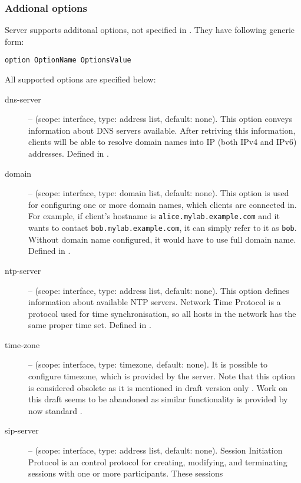 \subsubsection{Addional options}
Server supports additonal options, not specified in \cite{rfc3315}. They have
following generic form:

\begin{verbatim}
option OptionName OptionsValue
\end{verbatim}

All supported options are specified below:

\begin{description}
 \item[dns-server] -- (scope: interface, type: address list, default:
	    none). This option conveys information about DNS servers
	    available. After retriving this information, clients will be
	    able to resolve domain names into IP (both IPv4 and IPv6)
	    addresses. Defined in \cite{rfc3596}.
 \item[domain] -- (scope: interface, type: domain list, default:
	    none). This option is used for configuring one or more domain 
	    names, which clients are connected in. For example, if
	    client's hostname is \verb+alice.mylab.example.com+ and it wants to
	    contact \verb+bob.mylab.example.com+, it can simply refer to it as
	    \verb+bob+. Without domain name configured, it would have to
	    use full domain name. Defined in \cite{rfc3596}.
 \item[ntp-server] -- (scope: interface, type: address list, default:
	    none). This option defines information about available NTP
	    servers. Network Time Protocol \cite{rfc2030} is a protocol used
	    for time synchronisation, so all hosts in the network has
	    the same proper time set. Defined in \cite{rfc4075}.
 \item[time-zone] -- (scope: interface, type: timezone, default:
	    none). It is possible to configure timezone, which is
            provided by the server. Note that this option is
	    considered obsolete as it is mentioned in draft version only
	    \cite{draft-timezone}. Work on this draft seems to be
	    abandoned as similar functionality is provided by now
	    standard \cite{rfc4075}.
 \item[sip-server] -- (scope: interface, type: address list, default:
	    none). Session Initiation Protocol \cite{rfc3263} is an
	    control protocol for creating, modifying, and terminating
	    sessions with one or more participants. These sessions

\end{description}
